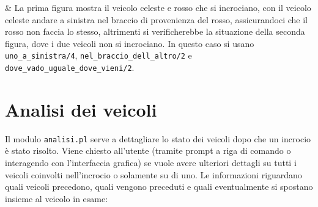 \begin{center}
\begin{longtabu}
		 & La prima figura mostra il veicolo celeste e rosso che si incrociano, con il veicolo celeste andare a sinistra nel braccio di provenienza del rosso, assicurandoci che il rosso non faccia lo stesso, altrimenti si verificherebbe la situazione della seconda figura, dove i due veicoli non si incrociano. In questo caso si usano \texttt{uno\_a\_sinistra/4}, \texttt{nel\_braccio\_dell\_altro/2} e \texttt{dove\_vado\_uguale\_dove\_vieni/2}.
	\end{longtabu}
\end{center}

\section{Analisi dei veicoli}
\label{sec:an}
Il modulo \texttt{analisi.pl} serve a dettagliare lo stato dei veicoli dopo che un incrocio è stato risolto. Viene chiesto all'utente (tramite prompt a riga di comando o interagendo con l'interfaccia grafica) se vuole avere ulteriori dettagli su tutti i veicoli coinvolti nell'incrocio o solamente su di uno. Le informazioni riguardano quali veicoli precedono, quali vengono preceduti e quali eventualmente si spostano insieme al veicolo in esame:

